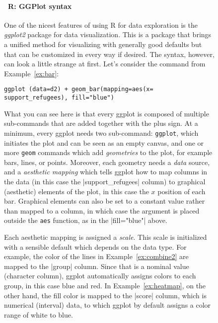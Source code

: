 %

\begin{figure}
  \vspace{-1em}
\begin{feature}
\footnotesize  \paragraph{\footnotesize\ R: GGPlot syntax}

One of the nicest features of using R for data exploration is the \emph{ggplot2} package for data visualization. This is a package that brings a unified method for visualizing with generally good defaults but that can be customized in every way if desired. The syntax, however, can look a little strange at first.
Let's consider the command from Example~\ref{ex:bar}:
\begin{verbatim}
ggplot (data=d2) + geom_bar(mapping=aes(x= support_refugees), fill="blue")
\end{verbatim}
What you can see here is that every ggplot is composed of multiple sub-commands that are added together with the plus sign. At a minimum, every ggplot needs two sub-command: \texttt{ggplot}, which initiates the plot and can be seen as an empty canvas, and one or more \texttt{geom} commands which add \emph{geometries} to the plot, for example bars, lines, or points. Moreover, each geometry needs a \emph{data} source, and a \emph{aesthetic mapping} which tells ggplot how to map columns in the data (in this case the |support_refugees| column) to graphical (aesthetic) elements of the plot, in this case the $x$ position of each bar. Graphical elements can also be set to a constant value rather than mapped to a column, in which case the argument is placed outside the \texttt{aes} function, as in the |fill="blue"| above.

Each aesthetic mapping is assigned a \emph{scale}. This scale is initialized with a sensible default which depends on the data type. For example, the color of the lines in  Example~\ref{ex:combine2} are mapped to the |group| column. Since that is a nominal value (character column), ggplot automatically assigns colors to each group, in this case blue and red.  In Example~\ref{ex:heatmap}, on the other hand, the fill color is mapped to the |score| column, which is numerical (interval) data, to which ggplot by default assigns a color range of white to blue.


\end{feature}
\end{figure}

